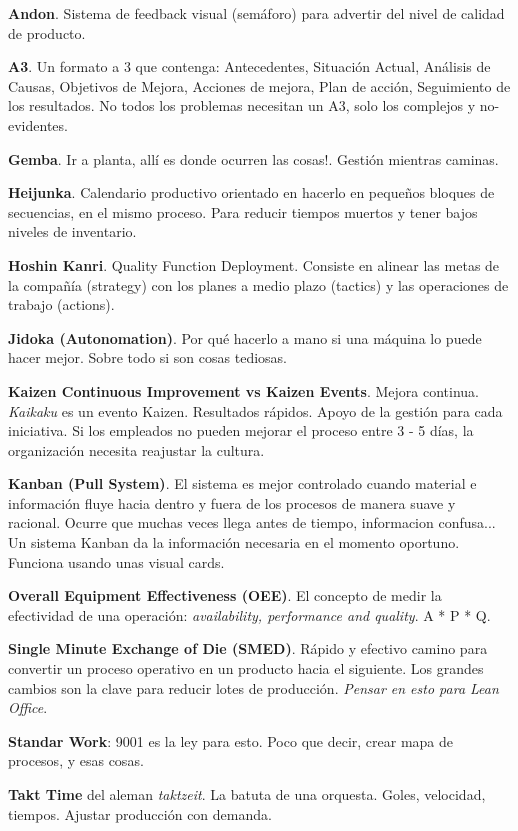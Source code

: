 \documentclass[]{article}
\begin{document}
\textbf{Andon}. Sistema de feedback visual (semáforo) para advertir del nivel de calidad de producto.

\textbf{A3}. Un formato a 3 que contenga: Antecedentes, Situación Actual, Análisis de Causas, Objetivos de Mejora, Acciones de mejora, Plan de acción, Seguimiento de los resultados. No todos los problemas necesitan un A3, solo los complejos y no-evidentes.

\textbf{Gemba}. Ir a planta, allí es donde ocurren las cosas!. Gestión mientras caminas.

\textbf{Heijunka}. Calendario productivo orientado en hacerlo en pequeños bloques de secuencias, en el mismo proceso. Para reducir tiempos muertos y tener bajos niveles de inventario.

\textbf{Hoshin Kanri}. Quality Function Deployment. Consiste en alinear las metas de la compañía (strategy) con los planes a medio plazo (tactics) y las operaciones de trabajo (actions). 

\textbf{Jidoka (Autonomation)}. Por qué hacerlo a mano si una máquina lo puede hacer mejor. Sobre todo si son cosas tediosas. 

\textbf{Kaizen Continuous Improvement vs Kaizen Events}. Mejora continua. \textit{Kaikaku} es un evento Kaizen. Resultados rápidos. Apoyo de la gestión para cada iniciativa. Si los empleados no pueden mejorar el proceso entre 3 - 5 días, la organización necesita reajustar la cultura.

\textbf{Kanban (Pull System)}. El sistema es mejor controlado cuando material e información fluye hacia dentro y fuera de los procesos de manera suave y racional. Ocurre que muchas veces llega antes de tiempo, informacion confusa... Un sistema Kanban da la información necesaria en el momento oportuno. Funciona usando unas visual cards.

\textbf{Overall Equipment Effectiveness (OEE)}. El concepto de medir la efectividad de una operación: \textit{availability, performance and quality}. A * P * Q. 

\textbf{Single Minute Exchange of Die (SMED)}. Rápido y efectivo camino para convertir un proceso operativo en un producto hacia el siguiente. Los grandes cambios son la clave para reducir lotes de producción. \textit{Pensar en esto para Lean Office}.

\textbf{Standar Work}: 9001 es la ley para esto. Poco que decir, crear mapa de procesos, y esas cosas.

\textbf{Takt Time} del aleman \textit{taktzeit}. La batuta de una orquesta. Goles, velocidad, tiempos. Ajustar producción con demanda.
\end{document}
